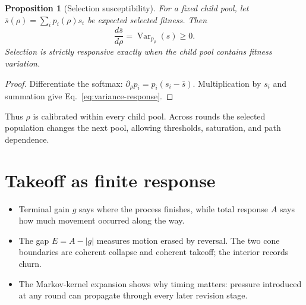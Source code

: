 \documentclass[10pt]{article}
\newtheorem{proposition}{Proposition}
\begin{document}
\begin{proposition}[Selection susceptibility]\label{prop:selector}
For a fixed child pool, let $\bar s(\rho)=\sum_i p_i(\rho)s_i$ be expected selected fitness. Then
\begin{equation}\label{eq:variance-response}
\frac{d\bar s}{d\rho}=\operatorname{Var}_{p_\rho}(s)\ge0.
\end{equation}
Selection is strictly responsive exactly when the child pool contains fitness variation.
\end{proposition}

\begin{proof}
Differentiate the softmax: $\partial_\rho p_i=p_i(s_i-\bar s)$. Multiplication by $s_i$ and summation give Eq.~\eqref{eq:variance-response}.
\end{proof}

Thus $\rho$ is calibrated within every child pool. Across rounds the selected population changes the next pool, allowing thresholds, saturation, and path dependence.

\clearpage
\section{Takeoff as finite response}

\begin{conceptbox}
\begin{itemize}[leftmargin=1.15em,itemsep=0.18em,topsep=0.05em]
\item Terminal gain $g$ says where the process finishes, while total response $A$ says how much movement occurred along the way.
\item The gap $E=A-|g|$ measures motion erased by reversal. The two cone boundaries are coherent collapse and coherent takeoff; the interior records churn.
\item The Markov-kernel expansion shows why timing matters: pressure introduced at any round can propagate through every later revision stage.
\end{itemize}
\end{conceptbox}
\end{document}

